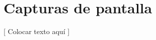 \documentclass[oneside]{book}
\begin{document}
\section{Capturas de pantalla}

	[ Colocar texto aquí ]
\bigskip











\end{document}
